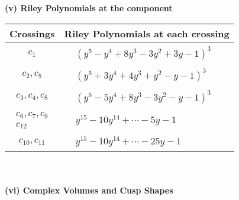 \documentclass[1p]{elsarticle_modified}
\theoremstyle{definition}
\begin{document}
\newpage\renewcommand{\arraystretch}{1}
\flushleft \textbf{(v) Riley Polynomials at the component}\newline \\
\begin{tabular}{m{50pt}|m{274pt}}
Crossings & \hspace{64pt}Riley Polynomials at each crossing \\
\hline $$\begin{aligned}c_{1}\end{aligned}$$&$\begin{aligned}
&(y^5- y^4+8 y^3-3 y^2+3 y-1)^3
\end{aligned}$\\
\hline $$\begin{aligned}c_{2},c_{5}\end{aligned}$$&$\begin{aligned}
&(y^5+3 y^4+4 y^3+y^2- y-1)^3
\end{aligned}$\\
\hline $$\begin{aligned}c_{3},c_{4},c_{8}\end{aligned}$$&$\begin{aligned}
&(y^5-5 y^4+8 y^3-3 y^2- y-1)^3
\end{aligned}$\\
\hline $$\begin{aligned}c_{6},c_{7},c_{9}\\c_{12}\end{aligned}$$&$\begin{aligned}
&y^{15}-10 y^{14}+\cdots-5 y-1
\end{aligned}$\\
\hline $$\begin{aligned}c_{10},c_{11}\end{aligned}$$&$\begin{aligned}
&y^{15}-10 y^{14}+\cdots-25 y-1
\end{aligned}$\\
\hline
\end{tabular}\\~\\
\newpage\flushleft \textbf{(vi) Complex Volumes and Cusp Shapes}
\end{document}
